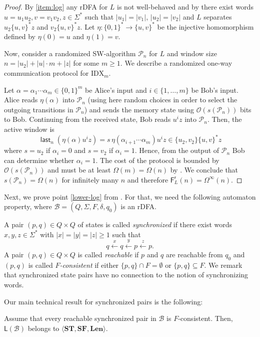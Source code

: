 \documentclass{article}\usepackage[a4paper,margin=20mm]{geometry}
\newcommand{\B}{\mathcal{B}}
\renewcommand{\O}{\mathcal{O}}
\renewcommand{\P}{\mathcal{P}}
\newcommand{\F}{\mathsf{F}}
\renewcommand{\L}{\mathsf{L}}
\renewcommand{\r}{\mathsf{r}}
\DeclareMathOperator{\last}{\mathsf{last}}
\newcommand{\Len}{\mathbf{Len}}
\newcommand{\ST}{\mathbf{ST}}
\newcommand{\SF}{\mathbf{SF}}
\renewcommand{\geq}{\geqslant}
\renewcommand{\ge}{\geq}
\newcommand{\Omegainf}{\Omega^{\scriptscriptstyle{\infty}}}
\begin{document}
\begin{proof}
By \ref{item:log} any rDFA for $L$ is not well-behaved 
and by  there exist words $u = u_1u_2, v = v_1v_2, z \in \Sigma^*$
such that $|u_1| = |v_1|$, $|u_2| = |v_2|$ and $L$ separates $u_2\{u,v\}^*z$ and $v_2\{u,v\}^*z$.
Let $\eta \colon \{0,1\}^* \to \{u,v\}^*$ be the injective homomorphism defined by
$\eta(0) = u$ and $\eta(1) = v$.

Now, consider a randomized SW-algorithm $\P_n$ for $L$ and window size
$n = |u_2| + |u| \cdot m + |z|$ for some $m \ge 1$.
We describe a randomized one-way communication protocol for $\mathrm{IDX}_m$.

Let $\alpha = \alpha_1 \cdots \alpha_m \in\{0,1\}^m$ be Alice's input and $i\in\{1,\dots,m\}$ be Bob's input.
Alice reads $\eta(\alpha)$ into $\P_n$ (using here random choices in order to select the outgoing
transitions in $\P_n$) and sends the memory state using $\O(s(\P_n))$ bits to Bob.
Continuing from the received state, Bob reads $u^i z$ into $\P_n$.
Then, the active window is
\[
	\last_n(\eta(\alpha) u^i z) = s \, \eta(\alpha_{i+1} \cdots \alpha_m) u^i z \in \{u_2,v_2\}\{u,v\}^*z
\]
where $s = u_2$ if $\alpha_i = 0$ and $s = v_2$ if $\alpha_i = 1$.
Hence, from the output of $\P_n$ Bob can determine whether $\alpha_i = 1$.
The cost of the protocol is bounded by $\O(s(\P_n))$
and must be at least $\Omega(m) = \Omega(n)$ by .
We conclude that $s(\P_n) = \Omega(n)$ for infinitely many $n$
and therefore $\F^\r_L(n) = \Omegainf(n)$.
\end{proof}

Next, we prove point \ref{lower-log} from .
For that, we need the following automaton property, where 
$\B = (Q,\Sigma,F,\delta,q_0)$ is an rDFA. 

A pair $(p,q)\in Q\times Q$ of states is called {\em synchronized}
if there exist words $x,y,z\in\Sigma^*$ with $|x|=|y|=|z| \geq 1$ such that
\[ 
q \xleftarrow{x} q  \xleftarrow{y} p \xleftarrow{z} p .
\]
A pair $(p,q)\in Q\times Q$ is called {\em reachable} if $p$ and $q$ are reachable from $q_0$
and $(p,q)$ is called {\em $F$-consistent} if either $\{p,q\} \cap F = \emptyset$
or $\{p,q\} \subseteq F$.
We remark that synchronized state pairs have no connection to the notion of synchronizing words.


Our main technical result for synchronized pairs is the following:

\begin{lemma}\label{lem:sync-pair}
Assume that every reachable synchronized pair in $\B$ is $F$-consistent.
Then, $\L(\B)$ belongs to $\langle \ST, \SF, \Len \rangle$.
\end{lemma}
\end{document}
